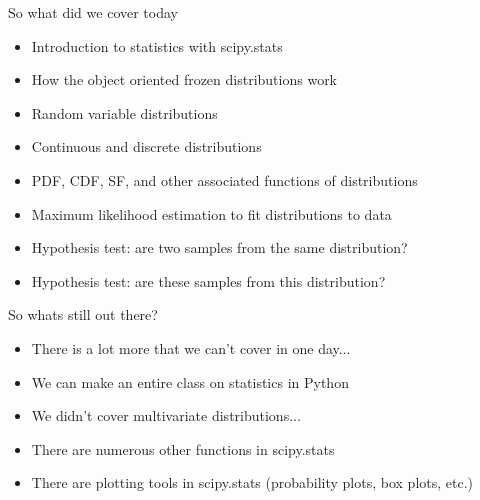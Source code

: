 \documentclass[10pt]{beamer}
\begin{document}

\begin{frame}{So what did we cover today}
\begin{itemize}
\item Introduction to statistics with scipy.stats
\item How the object oriented frozen distributions work
\item Random variable distributions
\item Continuous and discrete distributions
\item PDF, CDF, SF, and other associated functions of distributions
\item Maximum likelihood estimation to fit distributions to data
\item Hypothesis test: are two samples from the same distribution?
\item Hypothesis test: are these samples from this distribution?
\end{itemize}
\end{frame}

\begin{frame}{So whats still out there?}
\begin{itemize}
\item There is a lot more that we can't cover in one day...
\item We can make an entire class on statistics in Python
\item We didn't cover multivariate distributions...
\item There are numerous other functions in scipy.stats
\item There are plotting tools in scipy.stats (probability plots, box plots, etc.)
\end{itemize}
\end{frame}
\end{document}
